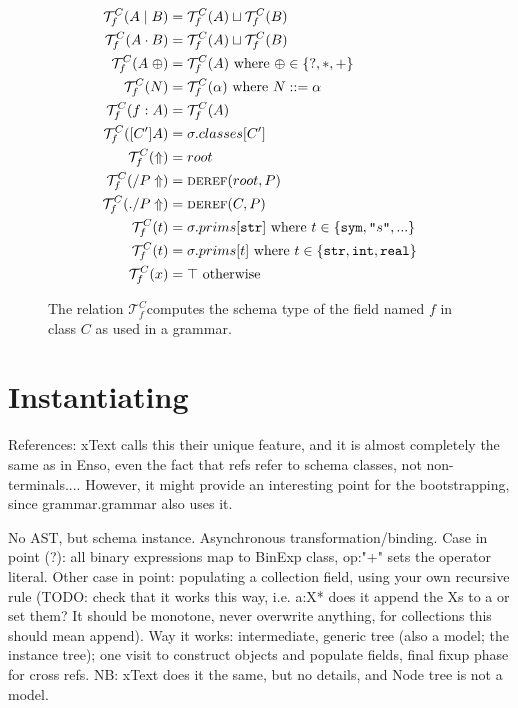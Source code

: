 \documentclass[preprint,10pt]{sigplanconf}
\begin{document}
\def\mytypejoin{\ensuremath{\sqcup}}
\def\mytypebottom{\ensuremath{\bot}}
\def\mytypetop{\ensuremath{\top}}
\def\typeof{\ensuremath{\mathcal{T}}}
\def\typeoff{\ensuremath{\typeof^C_f}}
\begin{figure}
\begin{align*}
\typeoff(A\mid B) &= \typeoff(A) \mytypejoin  \typeoff(B)\\
\typeoff(A\cdot B) &= \typeoff(A) \mytypejoin  \typeoff(B)\\
\typeoff(A\;\oplus) &= \typeoff(A) \text{ where } \oplus \in \{?, *, +\}\\
\typeoff(N) &= \typeoff(\alpha) \text{ where } N ::= \alpha\\
\typeoff(f: A) &= \typeoff(A)\\
\typeoff([C'] A) &= \sigma.classes[C']\\
\typeoff(\Uparrow) &= root\\
\typeoff(/P\Uparrow) &= \text{\textsc{deref}}(root, P)\\
\typeoff(./P\Uparrow) &= \text{\textsc{deref}}(C, P)\\
\typeoff(t) &= \sigma.prims[\text{\texttt{str}}] \text{ where } t\in\{\text{\texttt{sym}}, \literal{s}, ...\}\\
\typeoff(t) &= \sigma.prims[t] \text{ where } t\in \{\text{\texttt{str}}, \text{\texttt{int}}, \text{\texttt{real}} \}\\
\typeoff(x) &= \mytypetop \text{ otherwise}
\end{align*}
\caption{The relation \typeoff computes the schema type of the field named
  $f$ in class $C$ as used in a grammar.\label{FIG:typeof}}
\end{figure}




\section{Instantiating}

References: xText calls this their unique feature, and it is almost
completely the same as in Enso, even the fact that refs refer to
schema classes, not non-terminals.... However, it might provide an
interesting point for the bootstrapping, since grammar.grammar also
uses it.

No AST, but schema instance. Asynchronous transformation/binding. Case
in point (?): all binary expressions map to BinExp class, op:"+" sets
the operator literal. Other case in point: populating a collection
field, using your own recursive rule (TODO: check that it works this
way, i.e. a:X* does it append the Xs to a or set them? It should be
monotone, never overwrite anything, for collections this should mean
append). Way it works: intermediate, generic tree (also a model; the
instance tree); one visit to construct objects and populate fields,
final fixup phase for cross refs. NB: xText does it the same, but no
details, and Node tree is not a model.
\end{document}
